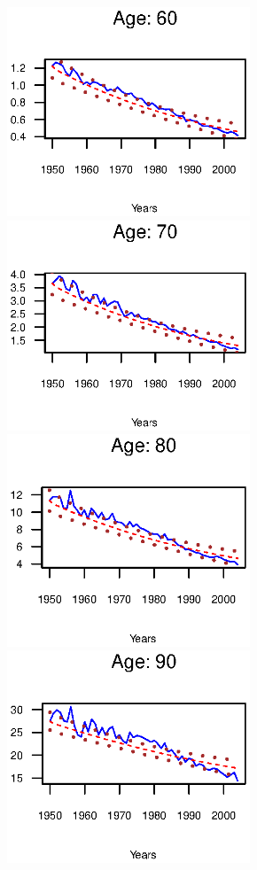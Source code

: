 \documentclass[smallextended]{svjour3}
\begin{document}
\begin{figure}[htb]
    \includegraphics[width = 2.85in]{PlotWomen60.eps}
    \includegraphics[width = 2.85in]{PlotWomen70.eps}
    \includegraphics[width = 2.85in]{PlotWomen80.eps}
    \includegraphics[width = 2.85in]{PlotWomen90.eps}

\end{figure}
\end{document}

